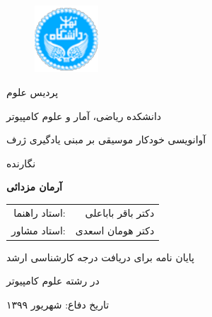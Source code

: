 \begin{figure}
    \centering
    \includegraphics[height=2.5cm]{./statics/UT-Logo.pdf}
\end{figure}

\begin{center}
    پردیس علوم

    دانشکده ریاضی، آمار و علوم کامپیوتر
\end{center}

\vspace{1cm}

\begin{center}
    \huge{آوانویسی خودکار موسیقی بر مبنی یادگیری ژرف}
\end{center}

\vspace{1cm}

\begin{center}
    نگارنده
\end{center}
\begin{center}
    \textbf{آرمان مزدائی}
\end{center}

\begin{center}
    \begin{tabular}{rr}
        استاد راهنما:& دکتر باقر باباعلی
        \\
        استاد مشاور:& دکتر هومان اسعدی
    \end{tabular}
\end{center}

\vspace{3cm}
\begin{center}
    پایان نامه برای دریافت درجه کارشناسی ارشد

    در رشته علوم کامپیوتر
\end{center}

\begin{center}
تاریخ دفاع: شهریور ۱۳۹۹
\end{center}

\pagestyle{empty}
\pagenumbering{}